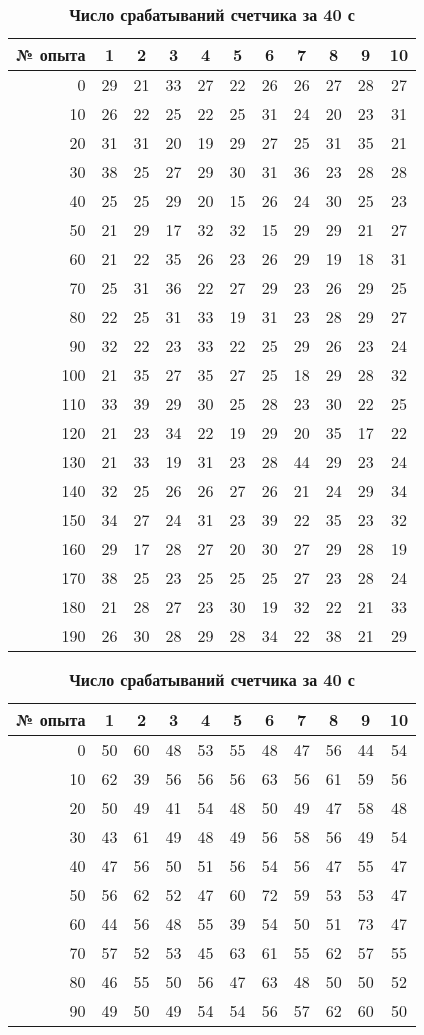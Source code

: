 \documentclass[a4paper, 10pt]{article}%
\begin{document}
\newpage
\begin{table}
\caption{\textbf{Число срабатываний счетчика за 20 с}}
\begin{tabular}{|r|c|c|c|c|c|c|c|c|c|c|}
\hline
№ опыта&1&2&3&4&5&6&7&8&9&10\\
\hline
0&29&21&33&27&22&26&26&27&28&27\\
\hline
10&26&22&25&22&25&31&24&20&23&31\\
\hline
20&31&31&20&19&29&27&25&31&35&21\\
\hline
30&38&25&27&29&30&31&36&23&28&28\\
\hline
40&25&25&29&20&15&26&24&30&25&23\\
\hline
50&21&29&17&32&32&15&29&29&21&27\\
\hline
60&21&22&35&26&23&26&29&19&18&31\\
\hline
70&25&31&36&22&27&29&23&26&29&25\\
\hline
80&22&25&31&33&19&31&23&28&29&27\\
\hline
90&32&22&23&33&22&25&29&26&23&24\\
\hline
100&21&35&27&35&27&25&18&29&28&32\\
\hline
110&33&39&29&30&25&28&23&30&22&25\\
\hline
120&21&23&34&22&19&29&20&35&17&22\\
\hline
130&21&33&19&31&23&28&44&29&23&24\\
\hline
140&32&25&26&26&27&26&21&24&29&34\\
\hline
150&34&27&24&31&23&39&22&35&23&32\\
\hline
160&29&17&28&27&20&30&27&29&28&19\\
\hline
170&38&25&23&25&25&25&27&23&28&24\\
\hline
180&21&28&27&23&30&19&32&22&21&33\\
\hline
190&26&30&28&29&28&34&22&38&21&29\\
\hline
\end{tabular}
\caption{\textbf{Число срабатываний счетчика за 40 с}}
\begin{tabular}{|r|c|c|c|c|c|c|c|c|c|c|}
\hline
№ опыта&1&2&3&4&5&6&7&8&9&10\\
\hline
0&50&60&48&53&55&48&47&56&44&54\\
\hline
10&62&39&56&56&56&63&56&61&59&56\\
\hline
20&50&49&41&54&48&50&49&47&58&48\\
\hline
30&43&61&49&48&49&56&58&56&49&54\\
\hline
40&47&56&50&51&56&54&56&47&55&47\\
\hline
50&56&62&52&47&60&72&59&53&53&47\\
\hline
60&44&56&48&55&39&54&50&51&73&47\\
\hline
70&57&52&53&45&63&61&55&62&57&55\\
\hline
80&46&55&50&56&47&63&48&50&50&52\\
\hline
90&49&50&49&54&54&56&57&62&60&50\\
\hline
\end{tabular}
\end{table}
\end{document}
